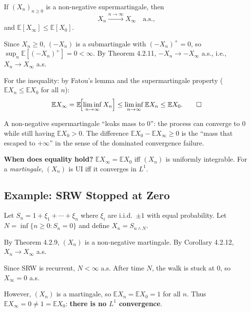 \documentclass[12pt]{article}
\newcommand{\E}{\mathbb{E}}
\newcommand{\1}{\mathbf{1}}
\begin{document}
\begin{tcolorbox}[redbox={Corollary 4.2.12 (Non-negative Supermartingale Converges)}]
If $(X_n)_{n \ge 0}$ is a non-negative supermartingale, then
\[
  X_n \xrightarrow{n \to \infty} X_\infty \quad \text{a.s.},
\]
and $\E[X_\infty] \le \E[X_0]$.
\end{tcolorbox}

\begin{tcolorbox}[redbox={Proof of Corollary 4.2.12}]
Since $X_n \ge 0$, $(-X_n)$ is a submartingale with $(-X_n)^+ = 0$, so
$\sup_n \E[(-X_n)^+] = 0 < \infty$.  By Theorem 4.2.11, $-X_n \to -X_\infty$ a.s.,
i.e., $X_n \to X_\infty$ a.s.

For the inequality: by Fatou's lemma and the supermartingale property
($\E X_n \le \E X_0$ for all $n$):
\[
  \E X_\infty = \E\!\Bigl[\liminf_{n\to\infty} X_n\Bigr]
  \le \liminf_{n\to\infty} \E X_n
  \le \E X_0. \qquad\square
\]
\end{tcolorbox}

\begin{tcolorbox}[bluebox={Intuition: Why the Inequality $\E X_\infty \le \E X_0$ Can Be Strict}]
A non-negative supermartingale ``leaks mass to $0$'': the process can converge to $0$
while still having $\E X_0 > 0$.  The difference $\E X_0 - \E X_\infty \ge 0$ is the
``mass that escaped to $+\infty$'' in the sense of the dominated convergence failure.

\medskip
\textbf{When does equality hold?} $\E X_\infty = \E X_0$ iff $(X_n)$ is uniformly
integrable.  For a \emph{martingale}, $(X_n)$ is UI iff it converges in $L^1$.
\end{tcolorbox}

\subsection{Example: SRW Stopped at Zero}

\begin{tcolorbox}[redbox={Example: Convergence Without $L^1$ Convergence}]
Let $S_n = 1 + \xi_1 + \cdots + \xi_n$ where $\xi_i$ are i.i.d.\ $\pm 1$ with equal
probability.  Let $N = \inf\{n \ge 0: S_n = 0\}$ and define $X_n = S_{n \wedge N}$.

By Theorem 4.2.9, $(X_n)$ is a non-negative martingale.  By Corollary 4.2.12,
$X_n \to X_\infty$ a.s.

Since SRW is recurrent, $N < \infty$ a.s.  After time $N$, the walk is stuck at $0$,
so $X_\infty = 0$ a.s.

However, $(X_n)$ is a martingale, so $\E X_n = \E X_0 = 1$ for all $n$.  Thus
$\E X_\infty = 0 \ne 1 = \E X_0$: \textbf{there is no $L^1$ convergence}.
\end{tcolorbox}
\end{document}
